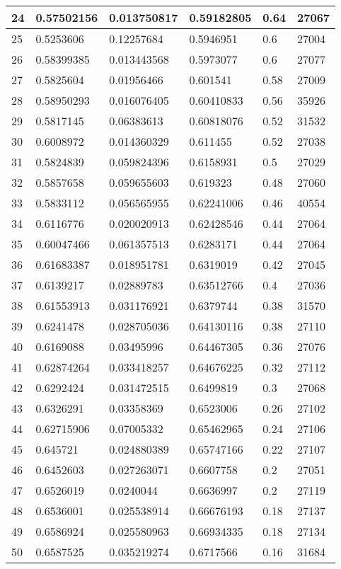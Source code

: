\begin{longtable}{|l|l|l|l|l|l|}
24 & 0.57502156 & 0.013750817 & 0.59182805 & 0.64 & 27067 \\ \hline 
25 & 0.5253606 & 0.12257684 & 0.5946951 & 0.6 & 27004 \\ \hline 
26 & 0.58399385 & 0.013443568 & 0.5973077 & 0.6 & 27077 \\ \hline 
27 & 0.5825604 & 0.01956466 & 0.601541 & 0.58 & 27009 \\ \hline 
28 & 0.58950293 & 0.016076405 & 0.60410833 & 0.56 & 35926 \\ \hline 
29 & 0.5817145 & 0.06383613 & 0.60818076 & 0.52 & 31532 \\ \hline 
30 & 0.6008972 & 0.014360329 & 0.611455 & 0.52 & 27038 \\ \hline 
31 & 0.5824839 & 0.059824396 & 0.6158931 & 0.5 & 27029 \\ \hline 
32 & 0.5857658 & 0.059655603 & 0.619323 & 0.48 & 27060 \\ \hline 
33 & 0.5833112 & 0.056565955 & 0.62241006 & 0.46 & 40554 \\ \hline 
34 & 0.6116776 & 0.020020913 & 0.62428546 & 0.44 & 27064 \\ \hline 
35 & 0.60047466 & 0.061357513 & 0.6283171 & 0.44 & 27064 \\ \hline 
36 & 0.61683387 & 0.018951781 & 0.6319019 & 0.42 & 27045 \\ \hline 
37 & 0.6139217 & 0.02889783 & 0.63512766 & 0.4 & 27036 \\ \hline 
38 & 0.61553913 & 0.031176921 & 0.6379744 & 0.38 & 31570 \\ \hline 
39 & 0.6241478 & 0.028705036 & 0.64130116 & 0.38 & 27110 \\ \hline 
40 & 0.6169088 & 0.03495996 & 0.64467305 & 0.36 & 27076 \\ \hline 
41 & 0.62874264 & 0.033418257 & 0.64676225 & 0.32 & 27112 \\ \hline 
42 & 0.6292424 & 0.031472515 & 0.6499819 & 0.3 & 27068 \\ \hline 
43 & 0.6326291 & 0.03358369 & 0.6523006 & 0.26 & 27102 \\ \hline 
44 & 0.62715906 & 0.07005332 & 0.65462965 & 0.24 & 27106 \\ \hline 
45 & 0.645721 & 0.024880389 & 0.65747166 & 0.22 & 27107 \\ \hline 
46 & 0.6452603 & 0.027263071 & 0.6607758 & 0.2 & 27051 \\ \hline 
47 & 0.6526019 & 0.0240044 & 0.6636997 & 0.2 & 27119 \\ \hline 
48 & 0.6536001 & 0.025538914 & 0.66676193 & 0.18 & 27137 \\ \hline 
49 & 0.6586924 & 0.025580963 & 0.66934335 & 0.18 & 27134 \\ \hline 
50 & 0.6587525 & 0.035219274 & 0.6717566 & 0.16 & 31684 \\ \hline 
\end{longtable}